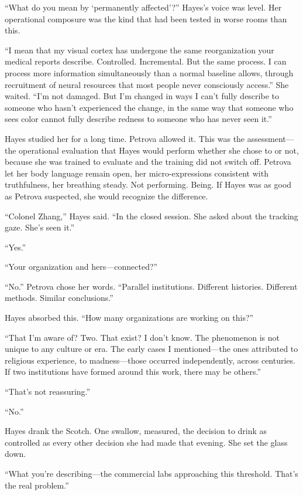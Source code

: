 ``What do you mean by `permanently affected'?'' Hayes's voice was level. Her operational composure was the kind that had been tested in worse rooms than this.

``I mean that my visual cortex has undergone the same reorganization your medical reports describe. Controlled. Incremental. But the same process. I can process more information simultaneously than a normal baseline allows, through recruitment of neural resources that most people never consciously access.'' She waited. ``I'm not damaged. But I'm changed in ways I can't fully describe to someone who hasn't experienced the change, in the same way that someone who sees color cannot fully describe redness to someone who has never seen it.''

Hayes studied her for a long time. Petrova allowed it. This was the assessment---the operational evaluation that Hayes would perform whether she chose to or not, because she was trained to evaluate and the training did not switch off. Petrova let her body language remain open, her micro-expressions consistent with truthfulness, her breathing steady. Not performing. Being. If Hayes was as good as Petrova suspected, she would recognize the difference.

``Colonel Zhang,'' Hayes said. ``In the closed session. She asked about the tracking gaze. She's seen it.''

``Yes.''

``Your organization and hers---connected?''

``No.'' Petrova chose her words. ``Parallel institutions. Different histories. Different methods. Similar conclusions.''

Hayes absorbed this. ``How many organizations are working on this?''

``That I'm aware of? Two. That exist? I don't know. The phenomenon is not unique to any culture or era. The early cases I mentioned---the ones attributed to religious experience, to madness---those occurred independently, across centuries. If two institutions have formed around this work, there may be others.''

``That's not reassuring.''

``No.''

Hayes drank the Scotch. One swallow, measured, the decision to drink as controlled as every other decision she had made that evening. She set the glass down.

``What you're describing---the commercial labs approaching this threshold. That's the real problem.''

